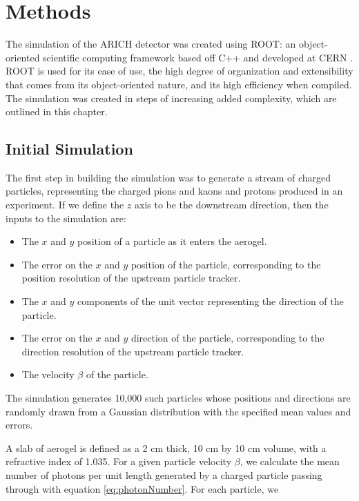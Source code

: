 
\chapter{Methods}
\label{ch:Methods}

The simulation of the ARICH detector was created using \textsc{ROOT}: an object-oriented scientific computing framework based off C++ and developed at CERN \cite{root}.
\textsc{ROOT} is used for its ease of use, the high degree of organization and extensibility that comes from its object-oriented nature, and its high efficiency when compiled.
The simulation was created in steps of increasing added complexity, which are outlined in this chapter.


\section{Initial Simulation}
\label{sec:experiment}
The first step in building the simulation was to generate a stream of charged particles, representing the charged pions and kaons and protons produced in an experiment.
If we define the $z$ axis to be the downstream direction, then the inputs to the simulation are:
\begin{itemize}
\item The $x$ and $y$ position of a particle as it enters the aerogel.
\item The error on the $x$ and $y$ position of the particle, corresponding to the position resolution of the upstream particle tracker.
\item The $x$ and $y$ components of the unit vector representing the direction of the particle.
\item The error on the $x$ and $y$ direction of the particle, corresponding to the direction resolution of the upstream particle tracker.
\item The velocity $\beta$ of the particle.
\end{itemize} 
The simulation generates 10,000 such particles whose positions and directions are randomly drawn from a Gaussian distribution with the specified mean values and errors. 

A slab of aerogel is defined as a 2 cm thick, 10 cm by 10 cm volume, with a refractive index of 1.035. 
For a given particle velocity $\beta$, we calculate the mean number of photons per unit length generated by a charged particle passing through with equation \ref{eq:photonNumber}. For each particle, we 

